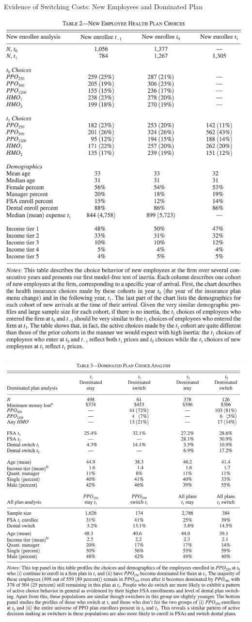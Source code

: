\documentclass[xcolor=pdftex,dvipsnames,table,mathserif,aspectratio=169]{beamer}
\begin{document}
\begin{frame}{Evidence of Switching Costs: New Employees and Dominated Plan}
\begin{center}
\includegraphics[scale=.3]{resources/handel_t2.png}
\includegraphics[scale=.3]{resources/handel_t3.png}
\end{center}
\end{frame}
\end{document}
